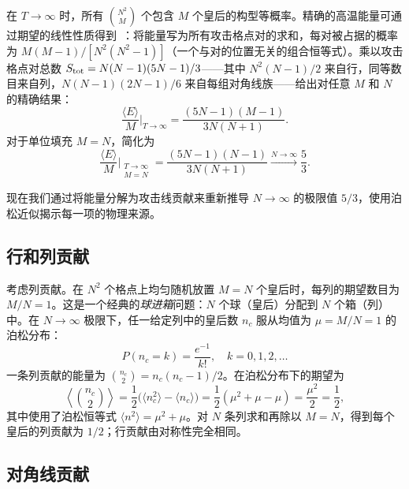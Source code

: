 \documentclass[aps, pre, reprint, amsmath, amssymb, superscriptaddress, floatfix]{revtex4-2}
\begin{document}
在 $T \to \infty$ 时，所有 $\binom{N^2}{M}$ 个包含 $M$ 个皇后的构型等概率。精确的高温能量可通过期望的线性性质得到~\cite{Polson2024}：将能量写为所有攻击格点对的求和，每对被占据的概率为 $M(M-1)/[N^2(N^2-1)]$（一个与对的位置无关的组合恒等式）。乘以攻击格点对总数 $S_{\rm tot} = N(N-1)(5N-1)/3$——其中 $N^2(N-1)/2$ 来自行，同等数目来自列，$N(N-1)(2N-1)/6$ 来自每组对角线族——给出对任意 $M$ 和 $N$ 的精确结果：
\begin{equation}
  \frac{\langle E \rangle}{M}\bigg|_{T \to \infty}
  = \frac{(5N-1)(M-1)}{3N(N+1)}.
  \label{eq:E_highT_general}
\end{equation}
对于单位填充 $M = N$，简化为
\begin{equation}
  \frac{\langle E \rangle}{M}\bigg|_{\substack{T \to \infty \\ M = N}}
  = \frac{(5N-1)(N-1)}{3N(N+1)}
  \xrightarrow{N \to \infty} \frac{5}{3}.
  \label{eq:E_highT}
\end{equation}

现在我们通过将能量分解为攻击线贡献来重新推导 $N \to \infty$ 的极限值 $5/3$，使用泊松近似揭示每一项的物理来源。

\subsection{行和列贡献}

考虑列贡献。在 $N^2$ 个格点上均匀随机放置 $M = N$ 个皇后时，每列的期望数目为 $M/N = 1$。这是一个经典的\textit{球进箱}问题：$N$ 个球（皇后）分配到 $N$ 个箱（列）中。在 $N \to \infty$ 极限下，任一给定列中的皇后数 $n_c$ 服从均值为 $\mu = M/N = 1$ 的泊松分布：
\begin{equation}
  P(n_c = k) = \frac{e^{-1}}{k!}, \quad k = 0, 1, 2, \ldots
  \label{eq:Poisson_col}
\end{equation}
一条列贡献的能量为 $\binom{n_c}{2} = n_c(n_c - 1)/2$。在泊松分布下的期望为
\begin{equation}
  \left\langle \binom{n_c}{2} \right\rangle
  = \frac{1}{2}\bigl(\langle n_c^2 \rangle - \langle n_c \rangle\bigr)
  = \frac{1}{2}(\mu^2 + \mu - \mu) = \frac{\mu^2}{2} = \frac{1}{2},
  \label{eq:col_energy}
\end{equation}
其中使用了泊松恒等式 $\langle n^2 \rangle = \mu^2 + \mu$。对 $N$ 条列求和再除以 $M = N$，得到每个皇后的列贡献为 $1/2$；行贡献由对称性完全相同。

\subsection{对角线贡献}
\end{document}
